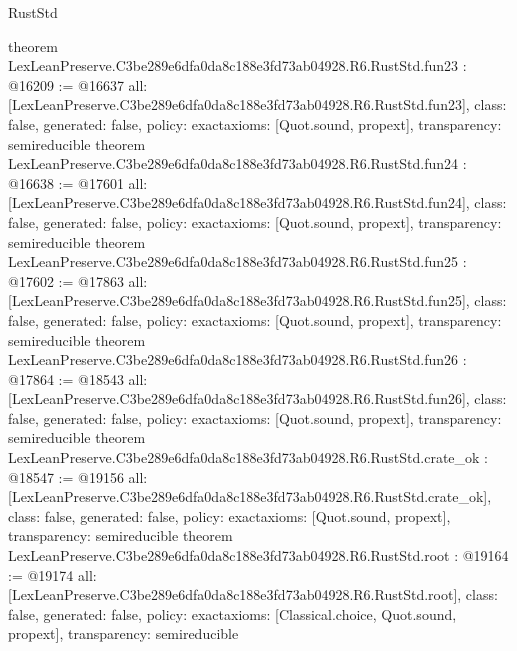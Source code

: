 \begin{lexlean}{RustStd}
\begin{coremodule}
{}
theorem LexLeanPreserve.C3be289e6dfa0da8c188e3fd73ab04928.R6.RustStd.fun23 : @16209 := @16637 {
  all: [LexLeanPreserve.C3be289e6dfa0da8c188e3fd73ab04928.R6.RustStd.fun23],
  class: false,
  generated: false,
  policy: exact{axioms: [Quot.sound, propext]},
  transparency: semireducible
}
theorem LexLeanPreserve.C3be289e6dfa0da8c188e3fd73ab04928.R6.RustStd.fun24 : @16638 := @17601 {
  all: [LexLeanPreserve.C3be289e6dfa0da8c188e3fd73ab04928.R6.RustStd.fun24],
  class: false,
  generated: false,
  policy: exact{axioms: [Quot.sound, propext]},
  transparency: semireducible
}
theorem LexLeanPreserve.C3be289e6dfa0da8c188e3fd73ab04928.R6.RustStd.fun25 : @17602 := @17863 {
  all: [LexLeanPreserve.C3be289e6dfa0da8c188e3fd73ab04928.R6.RustStd.fun25],
  class: false,
  generated: false,
  policy: exact{axioms: [Quot.sound, propext]},
  transparency: semireducible
}
theorem LexLeanPreserve.C3be289e6dfa0da8c188e3fd73ab04928.R6.RustStd.fun26 : @17864 := @18543 {
  all: [LexLeanPreserve.C3be289e6dfa0da8c188e3fd73ab04928.R6.RustStd.fun26],
  class: false,
  generated: false,
  policy: exact{axioms: [Quot.sound, propext]},
  transparency: semireducible
}
theorem LexLeanPreserve.C3be289e6dfa0da8c188e3fd73ab04928.R6.RustStd.crate_ok : @18547 := @19156 {
  all: [LexLeanPreserve.C3be289e6dfa0da8c188e3fd73ab04928.R6.RustStd.crate_ok],
  class: false,
  generated: false,
  policy: exact{axioms: [Quot.sound, propext]},
  transparency: semireducible
}
theorem LexLeanPreserve.C3be289e6dfa0da8c188e3fd73ab04928.R6.RustStd.root : @19164 := @19174 {
  all: [LexLeanPreserve.C3be289e6dfa0da8c188e3fd73ab04928.R6.RustStd.root],
  class: false,
  generated: false,
  policy: exact{axioms: [Classical.choice, Quot.sound, propext]},
  transparency: semireducible
}


\end{coremodule}
\end{lexlean}
